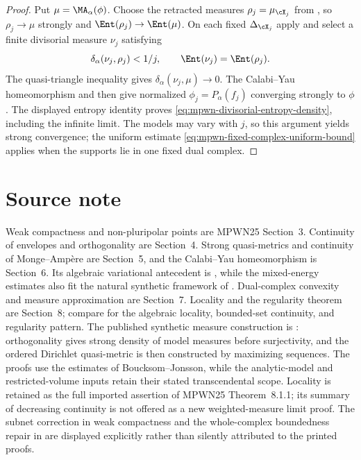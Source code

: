 \begin{proof}
Put $\mu=\MA_\alpha(\phi)$. Choose the retracted measures $\rho_j=\mu_{\cX_j}$ from , so $\rho_j\to\mu$ strongly and $\Ent(\rho_j)\to\Ent(\mu)$. On each fixed $\Delta_{\cX_j}$ apply  and select a finite divisorial measure $\nu_j$ satisfying
\[
 \delta_\alpha(\nu_j,\rho_j)<1/j,
 \qquad \Ent(\nu_j)=\Ent(\rho_j).
\]
The quasi-triangle inequality gives $\delta_\alpha(\nu_j,\mu)\to0$. The Calabi--Yau homeomorphism and  then give normalized $\phi_j=P_\alpha(f_j)$ converging strongly to $\phi$. The displayed entropy identity proves \eqref{eq:mpwn-divisorial-entropy-density}, including the infinite limit. The models may vary with $j$, so this argument yields strong convergence; the uniform estimate \eqref{eq:mpwn-fixed-complex-uniform-bound} applies when the supports lie in one fixed dual complex.
\end{proof}


\section*{Source note}
\label{sec:mpwn-cy-source-note}

\enlargethispage{2\baselineskip}

Weak compactness and non-pluripolar points are MPWN25 Section~3.
Continuity of envelopes and orthogonality are Section~4.  Strong
quasi-metrics and continuity of Monge--Amp\`ere are Section~5, and the
Calabi--Yau homeomorphism is Section~6.  Its algebraic variational
antecedent is \cite[Theorem~12.8]{BJ22}, while the mixed-energy estimates
also fit the natural synthetic framework of \cite{BJ25FiniteEnergy}.
Dual-complex convexity and
measure approximation are Section~7.  Locality and the regularity theorem
are Section~8; compare \cite[Theorems~7.40, 11.12, and~12.12]{BJ22} for the
algebraic locality, bounded-set continuity, and regularity pattern.
The published synthetic measure construction is
\cite[Theorems~2.22, 2.23 and~2.25, pp.~182--185]{BJ25FiniteEnergy}:
orthogonality gives strong density of model measures before
surjectivity, and the ordered Dirichlet quasi-metric is then
constructed by maximizing sequences. The proofs use the estimates
of Boucksom--Jonsson, while the analytic-model and restricted-volume
inputs retain their stated transcendental scope. Locality is retained
as the full imported assertion of MPWN25 Theorem~8.1.1; its summary
of decreasing continuity is not offered as a new weighted-measure
limit proof.  The subnet correction in weak compactness and the
whole-complex boundedness repair in
 are displayed explicitly rather than
silently attributed to the printed proofs.
